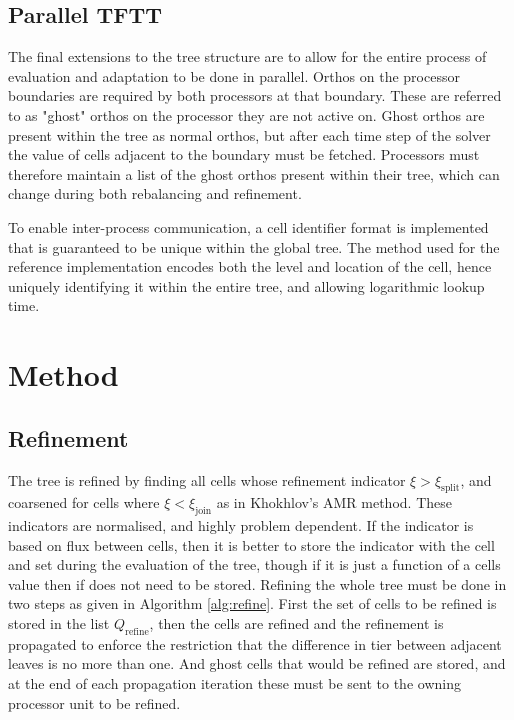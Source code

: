 \documentclass{IIBproject}
\begin{document}


\subsection{Parallel TFTT}

The final extensions to the tree structure are to allow for the entire process of evaluation and adaptation to be done in parallel. Orthos on the processor boundaries are required by both processors at that boundary. These are referred to as "ghost" orthos on the processor they are not active on. Ghost orthos are present within the tree as normal orthos, but after each time step of the solver the value of cells adjacent to the boundary must be fetched. Processors must therefore maintain a list of the ghost orthos present within their tree, which can change during both rebalancing and refinement. 

To enable inter-process communication, a cell identifier format is implemented that is guaranteed to be unique within the global tree. The method used for the reference implementation encodes both the level and location of the cell, hence uniquely identifying it within the entire tree, and allowing logarithmic lookup time. 


\section{Method}

\subsection{Refinement}

The tree is refined by finding all cells whose refinement indicator $\xi > \xi_{\mathrm{split}}$, and coarsened for cells where $\xi < \xi_{\mathrm{join}}$ as in Khokhlov's AMR method. These indicators are normalised, and highly problem dependent. If the indicator is based on flux between cells, then it is better to store the indicator with the cell and set during the evaluation of the tree, though if it is just a function of a cells value then if does not need to be stored. Refining the whole tree must be done in two steps as given in Algorithm \ref{alg:refine}. First the set of cells to be refined is stored in the list $Q_\mathrm{refine}$, then the cells are refined and the refinement is propagated to enforce the restriction that the difference in tier between adjacent leaves is no more than one. And ghost cells that would be refined are stored, and at the end of each propagation iteration these must be sent to the owning processor unit to be refined.
\end{document}
